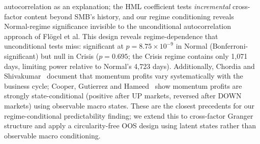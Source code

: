 \documentclass[sigconf,anonymous]{acmart}
\begin{document}
autocorrelation as an explanation; the HML coefficient tests \emph{incremental}
cross-factor content beyond SMB's history, and our regime conditioning reveals
Normal-regime significance invisible to the unconditional autocorrelation approach of Fl{\"o}gel et al.
This design reveals regime-dependence that unconditional tests miss:
significant at $p = 8.75 \times 10^{-9}$ in Normal (Bonferroni-significant)
but null in Crisis ($p = 0.695$; the Crisis regime contains only 1,071 days,
limiting power relative to Normal's 4,723 days).
Additionally, Chordia and Shivakumar~\cite{chordia2002momentum} document that
momentum profits vary systematically with the business cycle; Cooper, Gutierrez and
Hameed~\cite{cooper2004market} show momentum profits are strongly state-conditional
(positive after UP markets, reversed after DOWN markets) using observable macro states.
These are the closest precedents for our regime-conditional predictability finding; we extend
this to cross-factor Granger structure and apply a circularity-free OOS design using
latent states rather than observable macro conditioning.
\end{document}
